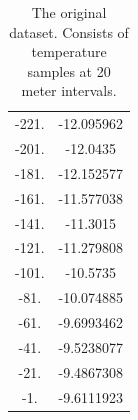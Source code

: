 \documentclass{article}%
\begin{document}
\begin{table}[h!]
\begin{tabular}{c|c}
            -221. & -12.095962 \\
            -201. & -12.0435   \\
            -181. & -12.152577 \\
            -161. & -11.577038 \\
            -141. & -11.3015   \\
            -121. & -11.279808 \\
            -101. & -10.5735   \\
             -81. & -10.074885 \\
             -61. &  -9.6993462\\
             -41. &  -9.5238077\\
             -21. &  -9.4867308\\
              -1. &  -9.6111923\\
        \end{tabular}
        \caption{The original dataset. Consists of temperature samples at 20 meter intervals. }
    \end{table}
\end{document}
